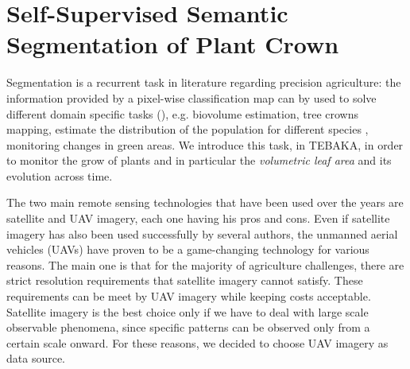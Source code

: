 \documentclass[comsoc,final]{IEEEtran}
\newcommand{\todo}[1]{\textcolor{red}{#1}}
\begin{document}

\section{Self-Supervised Semantic Segmentation of Plant Crown}\label{sec:activities}

Segmentation is a recurrent task in literature regarding precision agriculture: the information provided by a pixel-wise classification map can by used to solve different domain specific tasks (\cite{s21051617,rs14061523,Egli20201}), e.g. biovolume estimation, tree crowns mapping, estimate the distribution of the population for different species , monitoring changes in green areas. 
We introduce this task, in TEBAKA, in order to monitor the grow of
plants and in particular the \emph{volumetric leaf area} and its evolution across time.

The two main remote sensing technologies that have been used over the years are satellite and UAV imagery, each one having his pros and cons. Even if satellite imagery has also been used successfully by several authors\cite{ruswurm_multi-temporal_2018,daudt_fully_2018,ienco_land_2017},
the unmanned aerial vehicles (UAVs) have proven to be a game-changing technology for various reasons. The main one is that for the majority of agriculture challenges, there are strict resolution requirements that satellite imagery cannot satisfy. These requirements can be meet by UAV imagery while keeping costs acceptable. Satellite imagery is the best choice only if we have to deal with large scale observable phenomena\cite{gurumurthy_mango_2019,guirado_mask_2021}, since specific patterns can be observed only from a certain scale onward. For these reasons, we decided to choose UAV imagery as data source.
\end{document}
